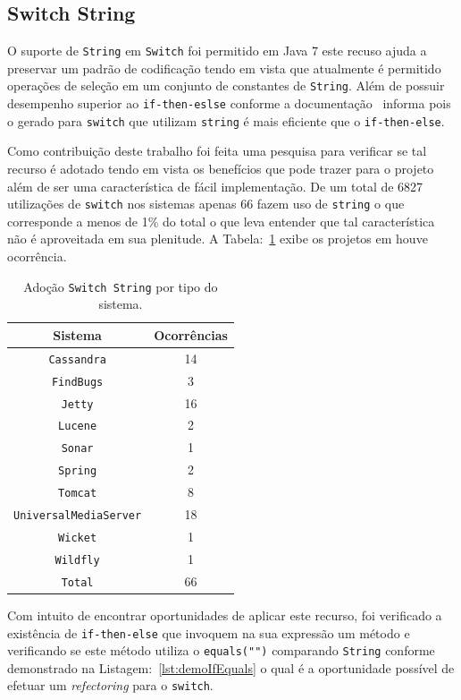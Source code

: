 \subsection{Switch String}

O suporte de \texttt{String} em \texttt{Switch} foi permitido em Java 7 este recuso ajuda a preservar um padrão de codificação tendo em vista que atualmente é permitido operações de seleção em um conjunto de constantes de \texttt{String}. Além de possuir desempenho superior ao \texttt{if-then-eslse} conforme a documentação~\cite{docSwitch} informa pois o gerado para \texttt{switch} que utilizam \texttt{string} é mais eficiente que o \texttt{if-then-else}.

Como contribuição deste trabalho foi feita uma pesquisa para verificar se tal recurso é adotado tendo em vista os benefícios que pode trazer para o projeto além de ser uma característica de fácil implementação. De um total de \num{6827} utilizações de \texttt{switch} nos sistemas apenas \num{66} fazem uso de \texttt{string} o que corresponde a menos de \num{1}\% do total o que leva entender que tal característica não é aproveitada em sua plenitude. A Tabela:~\ref{tab:adocaoSwitchString} exibe os projetos em houve ocorrência.


\begin{table}[ht] \footnotesize
	\centering
	\caption{Adoção \texttt{Switch String} por tipo do sistema.}
	\begin{tabular}{cc}
		\hline
		Sistema & Ocorrências \\ 
		\hline \hline
		\texttt{Cassandra} & 14 \\ 
		\texttt{FindBugs} & 3 \\ 
		\texttt{Jetty} & 16 \\
		\texttt{Lucene} & 2 \\
		\texttt{Sonar} & 1 \\
		\texttt{Spring} & 2 \\
		\texttt{Tomcat} & 8 \\
		\texttt{UniversalMediaServer} & 18 \\
		\texttt{Wicket} & 1 \\
		\texttt{Wildfly} & 1 \\	 \hline
		\texttt{Total} & 66 \\ \hline
	\end{tabular}
	\label{tab:adocaoSwitchString} %
\end{table}


Com intuito de encontrar oportunidades de aplicar este recurso, foi verificado a existência de \texttt{if-then-else} que invoquem na sua expressão um método e verificando se este método utiliza o \texttt{equals("")} comparando \texttt{String} conforme demonstrado na Listagem:~\ref{lst:demoIfEquals} o qual é a oportunidade possível de efetuar um  \textit{refectoring} para o \texttt{switch}.


